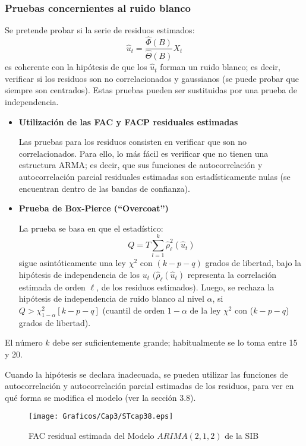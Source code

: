 \subsubsection{Pruebas concernientes al ruido blanco}

Se pretende probar si la serie de residuos estimados:
\[
\widehat{u}_{t}=\frac{\widehat{\Phi }(B)}{\widehat{\Theta }(B)}X_{t}
\]
es coherente con la hip\'{o}tesis de que los $\widehat{u}_{t}$ forman un ruido blanco; es decir, verificar si los residuos son no correlacionados y gaussianos (se puede probar que siempre son centrados). Estas pruebas pueden ser sustituidas por una prueba de independencia. 

\begin{itemize}
 \item \textbf{Utilizaci\'{o}n de las FAC y FACP residuales estimadas}
 
 Las pruebas para los residuos consisten en verificar que son no correlacionados. Para ello, lo m\'{a}s f\'{a}cil es verificar que no tienen una estructura ARMA; es decir, que sus funciones de autocorrelaci\'{o}n y autocorrelaci\'{o}n parcial residuales estimadas son estad\'{i}sticamente nulas (se encuentran dentro de las bandas de confianza). 

  \item \textbf{Prueba de Box-Pierce (``Overcoat'')}
  
  La prueba se basa en que el estad\'{i}stico:
 \[
 Q=T\sum_{l=1}^k {\widehat{\rho }_{\ell}^{2}\left( \widehat{u}_{t} \right)} 
 \]
 sigue asint\'{o}ticamente una ley $\chi^{2}$ con $(k-p-q)$ grados de libertad, bajo la hip\'{o}tesis de independencia de los $u_{t}$ $(\widehat{\rho }_{\ell}\left( \widehat{u}_{t} \right)$ representa la correlaci\'{o}n estimada de orden $\ell$, de los residuos estimados). Luego, se rechaza la hip\'{o}tesis de independencia de ruido blanco al nivel $\alpha $, si $Q>\chi_{1-\alpha }^{2}[k-p-q]$ (cuantil de orden $1-\alpha $ de la ley $\chi^{2}$ con ($k-p-q$) grados de libertad).
\end{itemize}

El n\'{u}mero $k$ debe ser suficientemente grande; habitualmente se lo toma entre 15 y 20.\newline

Cuando la hip\'{o}tesis se declara inadecuada, se pueden utilizar las funciones de autocorrelaci\'{o}n y autocorrelaci\'{o}n parcial estimadas de los residuos, para ver en qu\'{e} forma se modifica el modelo (ver la secci\'{o}n 3.8).

\begin{figure}[H]
\centering
\texttt{[image: Graficos/Cap3/STcap38.eps]}
\caption{FAC residual estimada del Modelo $ARIMA(2,1,2)$ de la SIB}
\end{figure}


